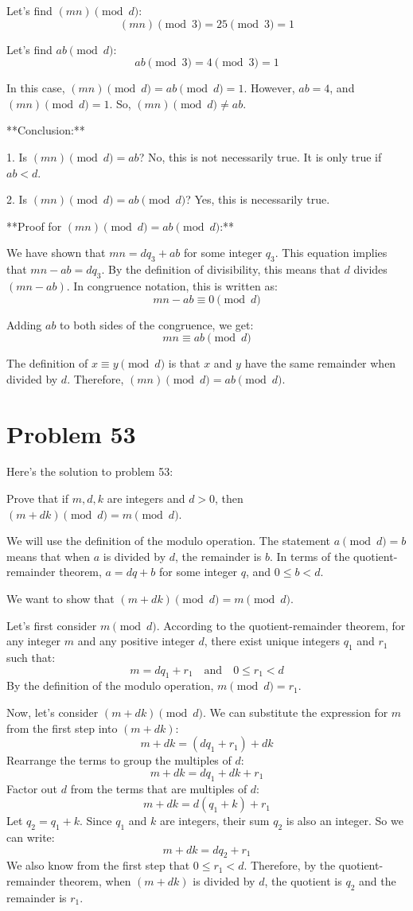 \documentclass{article}
\begin{document}
Let's find $(mn) \pmod{d}$:
$$ (mn) \pmod{3} = 25 \pmod{3} = 1 $$

Let's find $ab \pmod{d}$:
$$ ab \pmod{3} = 4 \pmod{3} = 1 $$

In this case, $(mn) \pmod{d} = ab \pmod{d} = 1$.
However, $ab = 4$, and $(mn) \pmod{d} = 1$. So, $(mn) \pmod{d} \ne ab$.

**Conclusion:**

1.  Is $(mn) \pmod{d} = ab$?
    No, this is not necessarily true. It is only true if $ab < d$.

2.  Is $(mn) \pmod{d} = ab \pmod{d}$?
    Yes, this is necessarily true.

**Proof for $(mn) \pmod{d} = ab \pmod{d}$:**

We have shown that $mn = dq_3 + ab$ for some integer $q_3$.
This equation implies that $mn - ab = dq_3$.
By the definition of divisibility, this means that $d$ divides $(mn - ab)$.
In congruence notation, this is written as:
$$ mn - ab \equiv 0 \pmod{d} $$

Adding $ab$ to both sides of the congruence, we get:
$$ mn \equiv ab \pmod{d} $$

The definition of $x \equiv y \pmod{d}$ is that $x$ and $y$ have the same remainder when divided by $d$. Therefore, $(mn) \pmod{d} = ab \pmod{d}$.

\newpage

\section*{Problem 53}
Here's the solution to problem 53:

Prove that if $m, d, k$ are integers and $d > 0$, then $(m + dk) \pmod{d} = m \pmod{d}$.

We will use the definition of the modulo operation. The statement $a \pmod{d} = b$ means that when $a$ is divided by $d$, the remainder is $b$. In terms of the quotient-remainder theorem, $a = dq + b$ for some integer $q$, and $0 \le b < d$.

We want to show that $(m + dk) \pmod{d} = m \pmod{d}$.

Let's first consider $m \pmod{d}$.
According to the quotient-remainder theorem, for any integer $m$ and any positive integer $d$, there exist unique integers $q_1$ and $r_1$ such that:
$$
m = dq_1 + r_1 \quad \text{and} \quad 0 \le r_1 < d
$$
By the definition of the modulo operation, $m \pmod{d} = r_1$.

Now, let's consider $(m + dk) \pmod{d}$.
We can substitute the expression for $m$ from the first step into $(m + dk)$:
$$
m + dk = (dq_1 + r_1) + dk
$$
Rearrange the terms to group the multiples of $d$:
$$
m + dk = dq_1 + dk + r_1
$$
Factor out $d$ from the terms that are multiples of $d$:
$$
m + dk = d(q_1 + k) + r_1
$$
Let $q_2 = q_1 + k$. Since $q_1$ and $k$ are integers, their sum $q_2$ is also an integer. So we can write:
$$
m + dk = dq_2 + r_1
$$
We also know from the first step that $0 \le r_1 < d$.
Therefore, by the quotient-remainder theorem, when $(m + dk)$ is divided by $d$, the quotient is $q_2$ and the remainder is $r_1$.
\end{document}
